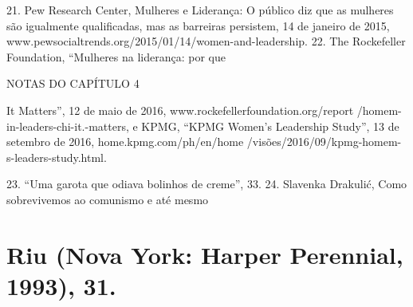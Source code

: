  \par 
21. Pew Research Center, Mulheres e Liderança: O público diz que as mulheres são igualmente qualificadas, mas as barreiras persistem, {\color{blue}14} de janeiro de 2015, www.pewsocialtrends.org/2015/01/14/women-and-leadership. {\color{blue}22}. The Rockefeller Foundation, “Mulheres na liderança: por que
 \par 
NOTAS DO CAPÍTULO {\color{blue}4}
 \par 
It Matters”, {\color{blue}12} de maio de 2016, www.rockefellerfoundation.org/report /homem-in-leaders-chi-it.-matters, e KPMG, “KPMG Women’s Leadership Study”, {\color{blue}13} de setembro de 2016, home.kpmg.com/ph/en/home /visões/2016/09/kpmg-homem-s-leaders-study.html.
 \par 
23. “Uma garota que odiava bolinhos de creme”, {\color{blue}33}. {\color{blue}24}. Slavenka Drakulić, Como sobrevivemos ao comunismo e até mesmo
 \par 
\section{Riu (Nova York: Harper Perennial, 1993), 31.}
 \par 
